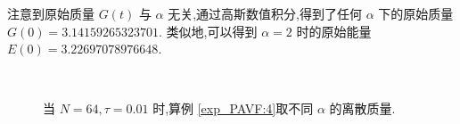 	注意到原始质量 $G(t)$ 与 $\alpha$ 无关,通过高斯数值积分,得到了任何 $\alpha$ 下的原始质量 $G(0)=3.14159265323701$.
	类似地,可以得到 $\alpha=2$ 时的原始能量 $E(0)=3.22697078976648$.

\begin{figure}[H]
	\begin{center}
	 \\
	\caption{当  $N = 64, \tau=0.01$ 时,算例 \ref{exp_PAVF:4}取不同 $\alpha$ 的离散质量.}
	\label{fig_PAVF:9}
	\end{center}
	\end{figure}

